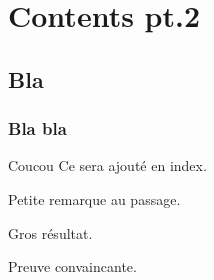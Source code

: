 
    
    \chapter{Contents pt.2}
        
        \minitoc
        \vfill
        \pagebreak
        
        \section{Bla}
        
            \subsection{Bla bla}
                
                \begin{definition}[label=transformation]{Coucou}{}
                    Ce  sera ajouté en index.
                \end{definition}
            
                \begin{remark}[label=remark1]{}{}
                    Petite remarque au passage.
                \end{remark}
                
                \begin{proposition}[label=prop1]{}{}
                    Gros résultat.
                \end{proposition}
                
                \begin{resultProof*}[label=proofProp1]{}
                    Preuve convaincante.
                \end{resultProof*}
                
